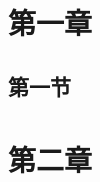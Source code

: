 \documentclass{sduthesis}
\begin{document}
\START
\makecoverpage
\maketable

\chapter{第一章}
\section{第一节}
\chapter{第二章}
\END
\end{document}
